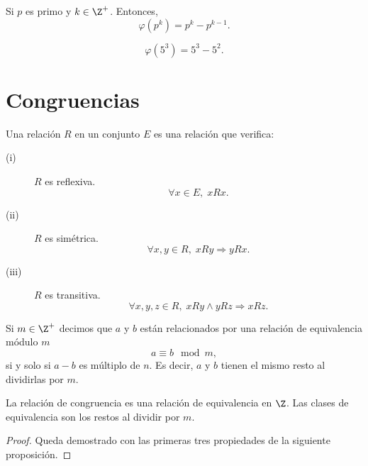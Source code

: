 \begin{ftheorem}[]
\normalfont Si $\displaystyle p $ es primo y $\displaystyle k \in \Z^{+} $. Entonces, 
\[\varphi\left(p^{k}\right) = p ^{ k} - p ^{k - 1} .\]
\end{ftheorem}

\begin{eg}
\normalfont 
\[\varphi\left(5^{3}\right) = 5^{3} - 5^{2} .\]
\end{eg}

\section{Congruencias}

\begin{fdefinition}
\normalfont Una relación $\displaystyle R $  en un conjunto $\displaystyle E $ es una relación que verifica: 
\begin{description}
\item[(i)] $\displaystyle R $ es reflexiva.
	\[\forall x \in E, \; x R x .\]
\item[(ii)] $\displaystyle R $ es simétrica. 
	\[\forall x, y \in R, \; x R y \Rightarrow y R x .\]
\item[(iii)] $\displaystyle R $ es transitiva.
	\[\forall x,y,z \in R, \; x R y \land y R z \Rightarrow x R z .\]
\end{description}
\end{fdefinition}

\begin{fdefinition}
\normalfont Si $\displaystyle m \in \Z^{+} $ decimos que $\displaystyle a $ y $\displaystyle b $ están relacionados por una relación de equivalencia módulo $\displaystyle m $ 
\[a \equiv b \mod m  ,\]
si y solo si $\displaystyle a-b $ es múltiplo de $\displaystyle n $. Es decir, $\displaystyle a $ y $\displaystyle b $ tienen el mismo resto al dividirlas por $\displaystyle m $.
\end{fdefinition}

\begin{ftheorem}[]
\normalfont La relación de congruencia es una relación de equivalencia en $\displaystyle \Z $. Las clases de equivalencia son los restos al dividir por $\displaystyle m $.
\end{ftheorem}
\begin{proof}
Queda demostrado con las primeras tres propiedades de la siguiente proposición.
\end{proof}

